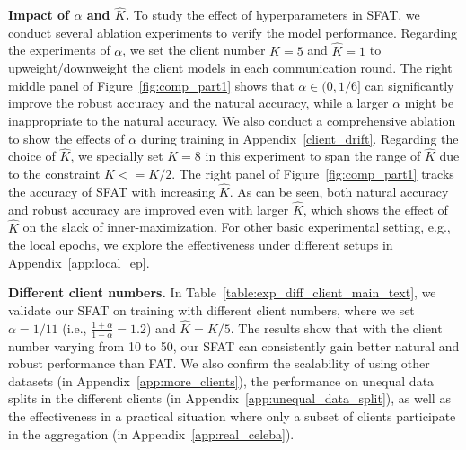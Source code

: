 \documentclass{article} %
\theoremstyle{plain}
\theoremstyle{definition}
\theoremstyle{remark}
\begin{document}
\textbf{Impact of $\alpha$ and $\widehat{K}$.} To study the effect of hyperparameters in SFAT, we conduct several ablation experiments to verify the model performance. Regarding the experiments of $\alpha$, we set the client number $K=5$ and $\widehat{K}=1$ to upweight/downweight the client models in each communication round. The right middle panel of Figure~\ref{fig:comp_part1} shows that $\alpha \in (0, 1/6]$ can significantly improve the robust accuracy and the natural accuracy, while a larger $\alpha$ might be inappropriate to the natural accuracy. We also conduct a comprehensive ablation to show the effects of $\alpha$ during training in Appendix~\ref{client_drift}. Regarding the choice of $\widehat{K}$, we specially set $K=8$ in this experiment to span the range of $\widehat{K}$ due to the constraint $\widehat{K}<=K/2$. The right panel of Figure~\ref{fig:comp_part1} tracks the accuracy of SFAT with increasing $\widehat{K}$.
As can be seen, both natural accuracy and robust accuracy are improved even with larger $\widehat{K}$, which shows the effect of $\widehat{K}$ on the slack of inner-maximization. For other basic experimental setting, e.g., the local epochs, we explore the effectiveness under different setups in Appendix~\ref{app:local_ep}.


\textbf{Different client numbers.} In Table~\ref{table:exp_diff_client_main_text}, we validate our SFAT on training with different client numbers, where we set $\alpha=1/11$ (i.e., $\frac{1+\alpha}{1-\alpha}=1.2$) and $\widehat{K}=K/5$. The results show that with the client number varying from 10 to 50, our SFAT can consistently gain better natural and robust performance than FAT. We also confirm the scalability of using other datasets (in Appendix~\ref{app:more_clients}), the performance on unequal data splits in the different clients (in Appendix~\ref{app:unequal_data_split}), as well as the effectiveness in a practical situation where only a subset of clients participate in the aggregation (in Appendix~\ref{app:real_celeba}).
\end{document}
